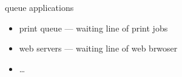 \begin{frame}{queue applications}
    \begin{itemize}
    \item print queue --- waiting line of print jobs
    \item web servers --- waiting line of web brwoser
    \item \ldots
    \end{itemize}
\end{frame}
